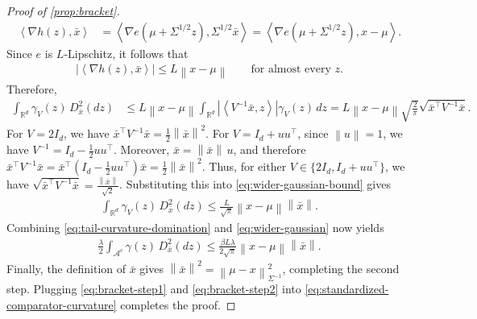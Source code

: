 \documentclass{article}
\newcommand{\R}{\mathbb R}
\newcommand{\1}{\mathbf 1}
\newcommand{\ip}[2]{\left\langle #1,#2\right\rangle}
\newcommand{\norm}[1]{\left\lVert #1\right\rVert}
\newcommand{\normm}[2]{\left\lVert #1\right\rVert_{#2}}
\begin{document}
\begin{proof}[Proof of \cref{prop:bracket}]
\begin{align}
        \ip{\nabla h(z)}{\bar{x}}
         & =
        \ip{\nabla e(\mu+\Sigma^{1/2}z)}
        {\Sigma^{1/2}\bar{x}}
        =
        \ip{\nabla e(\mu+\Sigma^{1/2}z)}
        {x-\mu}.
    \end{align}
    Since $e$ is $L$-Lipschitz, it follows that
    \begin{align}
        \left|\ip{\nabla h(z)}{\bar{x}}\right|
        \leq
        L\norm{x-\mu}
        \qquad\text{for almost every }z.
    \end{align}
    Therefore,
    \begin{align}
        \int_{\R^d}\gamma_V(z)\,D^2_{\bar{x}}(dz)
         & \leq
        L\norm{x-\mu}
        \int_{\R^d}
        \left|\ip{V^{-1}\bar{x}}{z}\right|
        \gamma_V(z)\,dz
        =
        L\norm{x-\mu}
        \sqrt{\frac{2}{\pi}}
        \sqrt{\bar{x}^\top V^{-1}\bar{x}}.
        \label{eq:wider-gaussian-bound}
    \end{align}
    For $V=2I_d$, we have
    $\bar{x}^\top V^{-1}\bar{x}=\frac12\norm{\bar{x}}^2$.
    For $V=I_d+uu^\top$, since $\norm u=1$,
    we have
    $V^{-1}
        =
        I_d-\frac12uu^\top$.
    Moreover, $\bar{x}=\norm{\bar{x}}\,u$, and therefore
    $\bar{x}^\top V^{-1}\bar{x}=
        \bar{x}^\top
        \left(I_d-\frac12uu^\top\right)\bar{x}
        =\frac12\norm{\bar{x}}^2$.
    Thus, for either
    $V\in\{2I_d,I_d+uu^\top\}$,
    we have
    $\sqrt{\bar{x}^\top V^{-1}\bar{x}} = \frac{\norm{\bar{x}}}{\sqrt2}$.
    Substituting this into \eqref{eq:wider-gaussian-bound} gives
    \begin{align}
        \int_{\R^d}\gamma_V(z)\,D^2_{\bar{x}}(dz)
        \leq
        \frac{L}{\sqrt\pi}
        \norm{x-\mu}\norm{\bar{x}}.
        \label{eq:wider-gaussian}
    \end{align}
    Combining \eqref{eq:tail-curvature-domination} and
    \eqref{eq:wider-gaussian} now yields
    \begin{align}
        \frac{\lambda}{2}\int_{\mathcal A^c}\gamma(z)\,D^2_{\bar{x}}(dz)
        \leq
        \frac{\beta L \lambda}{2\sqrt\pi}
        \norm{x-\mu}\norm{\bar{x}}.
        \label{eq:bracket-step2}
    \end{align}
    Finally, the definition of $\bar{x}$ gives
    $\norm{\bar{x}}^2=\normm{\mu-x}{\Sigma^{-1}}^2$,
    completing the second step.
    Plugging \eqref{eq:bracket-step1} and \eqref{eq:bracket-step2}
    into \eqref{eq:standardized-comparator-curvature}
    completes the proof.
\end{proof}
\end{document}

